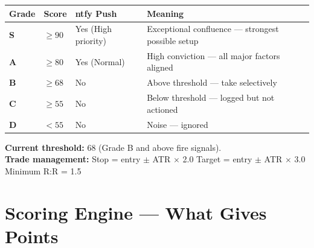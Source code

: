 \documentclass[11pt,a4paper]{article}
\begin{document}
\renewcommand{\arraystretch}{1.5}
\begin{tabularx}{\linewidth}{>{\bfseries\centering}p{1.4cm} >{\centering}p{2.4cm} >{\centering}p{2.4cm} X}
  \toprule
  \rowcolor{accent}\color{white}\textbf{Grade} & \color{white}\textbf{Score} & \color{white}\textbf{ntfy Push} & \color{white}\textbf{Meaning} \\
  \midrule
  \rowcolor{rowgreen} S & $\geq 90$ & Yes (High priority) & Exceptional confluence --- strongest possible setup \\
  \rowcolor{rowblue}  A & $\geq 80$ & Yes (Normal) & High conviction --- all major factors aligned \\
  \rowcolor{lightgray} B & $\geq 68$ & No & Above threshold --- take selectively \\
  \rowcolor{roworange} C & $\geq 55$ & No & Below threshold --- logged but not actioned \\
  \rowcolor{lightgray} D & $< 55$   & No & Noise --- ignored \\
  \bottomrule
\end{tabularx}

\vspace{6pt}
\begin{infobox}
\textbf{Current threshold:} 68 (Grade B and above fire signals). \\
\textbf{Trade management:} Stop = entry $\pm$ ATR $\times$ 2.0 \quad Target = entry $\pm$ ATR $\times$ 3.0 \quad Minimum R:R = 1.5
\end{infobox}

\section{Scoring Engine --- What Gives Points}
\end{document}
